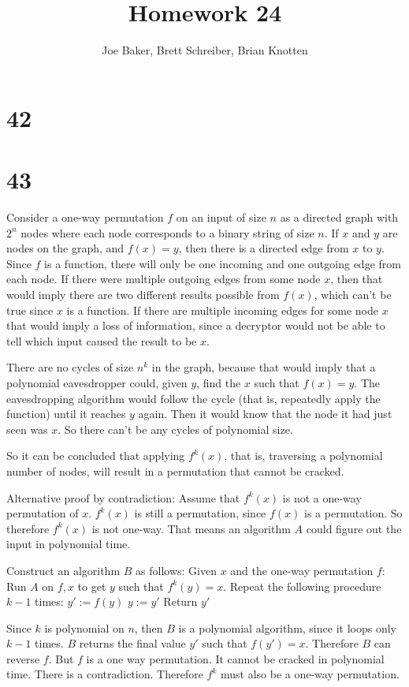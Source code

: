 \documentclass[letterpaper,notitlepage,twoside]{article}
\begin{document}
\title{Homework 24}
\author{Joe Baker, Brett Schreiber, Brian Knotten}
\maketitle
\section*{42}

\section*{43}
Consider a one-way permutation $f$ on an input of size $n$ as a directed graph with $2^n$ nodes where each node corresponds to a binary string of size $n$. If $x$ and $y$ are nodes on the graph, and $f(x) = y$, then there is a directed edge from $x$ to $y$. Since $f$ is a function, there will only be one incoming and one outgoing edge from each node. If there were multiple outgoing edges from some node $x$, then that would imply there are two different results possible from $f(x)$, which can't be true since $x$ is a function. If there are multiple incoming edges for some node $x$ that would imply a loss of information, since a decryptor would not be able to tell which input caused the result to be $x$.

There are no cycles of size $n^k$ in the graph, because that would imply that a polynomial eavesdropper could, given $y$, find the $x$ such that $f(x) = y$. The eavesdropping algorithm would follow the cycle (that is, repeatedly apply the function) until it reaches $y$ again. Then it would know that the node it had just seen was $x$. So there can't be any cycles of polynomial size.

So it can be concluded that applying $f^k(x)$, that is, traversing a polynomial number of nodes, will result in a permutation that cannot be cracked.

Alternative proof by contradiction:
Assume that $f^k(x)$ is not a one-way permutation of $x$. $f^k(x)$ is still a permutation, since $f(x)$ is a permutation. So therefore $f^k(x)$ is not one-way. That means an algorithm $A$ could figure out the input in polynomial time.

Construct an algorithm $B$ as follows:
Given $x$ and the one-way permutation $f$:
\tab Run $A$ on $f, x$ to get $y$ such that $f^k(y) = x$.
\tab Repeat the following procedure $k - 1$ times:
\tab\tab $y' := f(y)$
\tab\tab $y := y'$
\tab Return $y'$

Since $k$ is polynomial on $n$, then $B$ is a polynomial algorithm, since it loops only $k - 1$ times. $B$ returns the final value $y'$ such that $f(y') = x$. Therefore $B$ can reverse $f$. But $f$ is a one way permutation. It cannot be cracked in polynomial time. There is a contradiction. Therefore $f^k$ must also be a one-way permutation.
\end{document}
